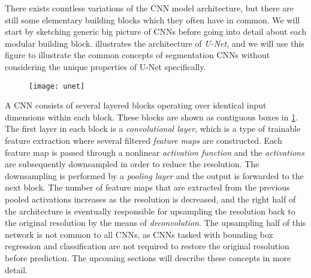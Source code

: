 There exists countless variations of the CNN model architecture, but there are still some elementary building blocks which they often have in common.
We will start by sketching generic big picture of CNNs before going into detail about each modular building block.
 illustrates the architecture of \textit{U-Net}, and we will use this figure to illustrate the common concepts of segmentation CNNs without considering the unique properties of U-Net specifically.

\begin{figure}[htb]
  \texttt{[image: unet]}
  \label{fig:unet}
\end{figure}

A CNN consists of several layered blocks operating over identical input dimensions within each block.
These blocks are shown as contiguous boxes in \cref{fig:unet}.
The first layer in each block is a \textit{convolutional layer}, which is a type of trainable feature extraction where several filtered \textit{feature maps} are constructed.
Each feature map is passed through a nonlinear \textit{activation function} and the \textit{activations} are subsequently downsampled in order to reduce the resolution.
The downsampling is performed by a \textit{pooling layer} and the output is forwarded to the next block.
The number of feature maps that are extracted from the previous pooled activations increases as the resolution is decreased, and the right half of the architecture is eventually responsible for upsampling the resolution back to the original resolution by the means of \textit{deconvolution}.
The upsampling half of this network is not common to all CNNs, as CNNs tasked with bounding box regression and classification are not required to restore the original resolution before prediction.
The upcoming sections will describe these concepts in more detail.
